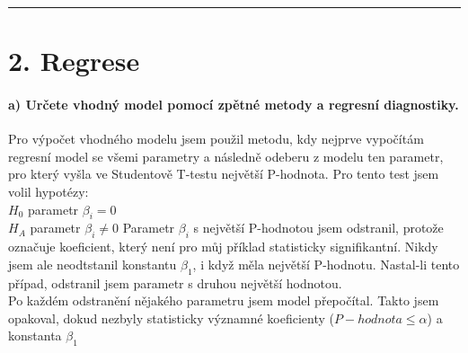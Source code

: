 \documentclass[11pt]{article}
\begin{document}
    \begin{center}\rule{0.5\linewidth}{0.5pt}\end{center}

\hypertarget{regrese}{%
\section{2. Regrese}\label{regrese}}

    \hypertarget{a-urux10dete-vhodnuxfd-model-pomocuxed-zpux11btnuxe9-metody-a-regresnuxed-diagnostiky.}{%
\paragraph{a) Určete vhodný model pomocí zpětné metody a regresní
diagnostiky.}\label{a-urux10dete-vhodnuxfd-model-pomocuxed-zpux11btnuxe9-metody-a-regresnuxed-diagnostiky.}}

Pro výpočet vhodného modelu jsem použil metodu, kdy nejprve vypočítám
regresní model se všemi parametry a následně odeberu z modelu ten
parametr, pro který vyšla ve Studentově T-testu největší P-hodnota. Pro
tento test jsem volil hypotézy:\\
\(H_0\) parametr \(\beta_i = 0\)\\
\(H_A\) parametr \(\beta_i \neq 0\) Parametr \(\beta_i\) s největší
P-hodnotou jsem odstranil, protože označuje koeficient, který není pro
můj příklad statisticky signifikantní. Nikdy jsem ale neodtstanil
konstantu \(\beta_1\), i když měla největší P-hodnotu. Nastal-li tento
případ, odstranil jsem parametr s druhou největší hodnotou.\\
Po každém odstranění nějakého parametru jsem model přepočítal. Takto
jsem opakoval, dokud nezbyly statisticky významné koeficienty
(\(P-hodnota \leq \alpha\)) a konstanta \(\beta_1\)
\end{document}
